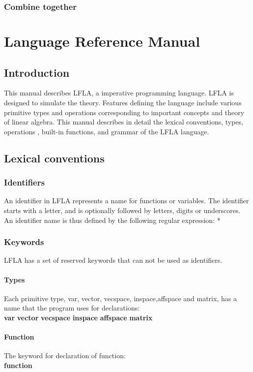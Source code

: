 \documentclass[12pt]{article} %
\begin{document}
\subsubsection{Combine together} 
\section{Language Reference Manual}
\subsection{Introduction}
This manual describes LFLA, a imperative programming language.  LFLA is
designed to  simulate the theory. Features defining the language
include  various primitive types and operations  corresponding to important concepts and theory  of  linear algebra. This manual
describes in detail the lexical conventions, types,  operations , built-in functions, and grammar of the LFLA
language.


\subsection{Lexical conventions}

\subsubsection{Identifiers}
An identifier in LFLA represents a name for functions or variables. The identifier starts with a letter, and is optionally followed by letters, digits or underscores. An identifier name is thus defined
by the following regular expression:  
  \newline
['a' - 'z' 'A' -'Z' ] ['a' - 'z' 'A' - 'Z' '0' - '9' '\_']*

\subsubsection{Keywords}
LFLA has a set of reserved keywords that can not be used as identifiers.
\paragraph{Types} Each primitive type, var, vector, vecspace, inspace,affspace and matrix, has a name that the program
uses for declarations:\\
 \textbf{var}  \quad  \textbf{vector}  \quad\textbf{vecspace} \quad\textbf{ inspace} \quad \textbf{affspace} \quad \textbf{matrix}
 \paragraph{Function}The keyword for declaration of  function:\\
\textbf{function}
\end{document}
